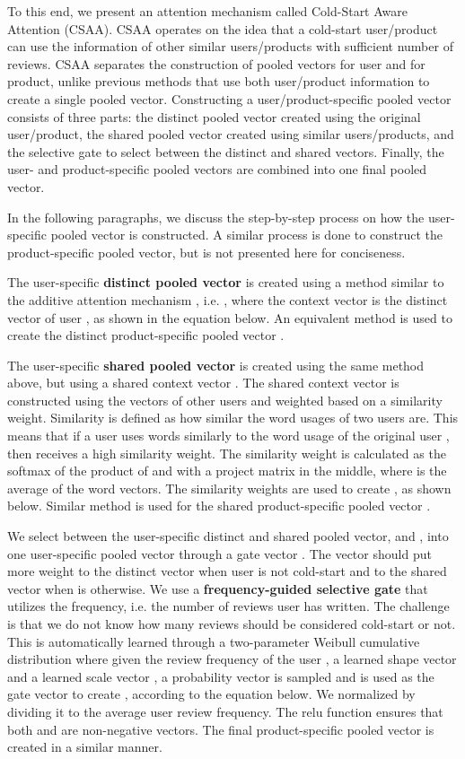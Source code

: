 \documentclass[11pt,a4paper]{article}
\begin{document}
To this end, we present an attention mechanism called Cold-Start Aware Attention (CSAA). CSAA operates on the idea that a cold-start user/product can use the information of other similar users/products with sufficient number of reviews. CSAA separates the construction of pooled vectors for user and for product, unlike previous methods that use both user/product information to create a single pooled vector.
Constructing a user/product-specific pooled vector consists of three parts: the distinct pooled vector created using the original user/product, the shared pooled vector created using similar users/products, and the selective gate to select between the distinct and shared vectors. Finally, the user- and product-specific pooled vectors are combined into one final pooled vector.

In the following paragraphs, we discuss the step-by-step process on how the user-specific pooled vector is constructed. A similar process is done to construct the product-specific pooled vector, but is not presented here for conciseness.

The user-specific \textbf{distinct pooled vector}  is created using a method similar to the additive attention mechanism \cite{Bahdanau2014NeuralMT}, i.e. , where the context vector is the distinct vector of user , as shown in the equation below. An equivalent method is used to create the distinct product-specific pooled vector .

The user-specific \textbf{shared pooled vector}  is created using the same method above, but using a shared context vector .
The shared context vector  is constructed using the vectors of other users and weighted based on a similarity weight. Similarity is defined as how similar the word usages of two users are.
This means that if a user  uses words similarly to the word usage of the original user , then  receives a high similarity weight.
The similarity weight  is calculated as the softmax of the product of  and  with a project matrix in the middle, where  is the average of the word vectors. The similarity weights are used to create , as shown below. Similar method is used for the shared product-specific pooled vector .



We select between the user-specific distinct and shared pooled vector,  and , into one user-specific pooled vector  through a gate vector . The vector  should put more weight to the distinct vector when user  is not cold-start and to the shared vector when  is otherwise. We use a \textbf{frequency-guided selective gate} that utilizes the frequency, i.e. the number of reviews user  has written. The challenge is that we do not know how many reviews should be considered cold-start or not. This is automatically learned through a two-parameter Weibull cumulative distribution where given the review frequency of the user , a learned shape vector  and a learned scale vector , a probability vector is sampled and is used as the gate vector  to create , according to the equation below.
We normalized  by dividing it to the average user review frequency.
The relu function ensures that both  and  are non-negative vectors. The final product-specific pooled vector  is created in a similar manner.
\end{document}

